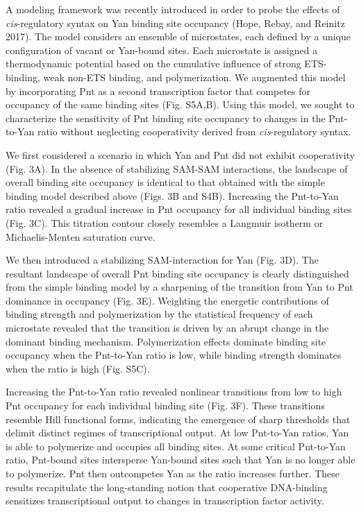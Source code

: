 A modeling framework was recently introduced in order to probe the effects of \textit{cis}-regulatory syntax on Yan binding site occupancy (Hope, Rebay, and Reinitz 2017). The model considers an ensemble of microstates, each defined by a unique configuration of vacant or Yan-bound sites. Each microstate is assigned a thermodynamic potential based on the cumulative influence of strong ETS-binding, weak non-ETS binding, and polymerization. We augmented this model by incorporating Pnt as a second transcription factor that competes for occupancy of the same binding sites (Fig. S5A,B). Using this model, we sought to characterize the sensitivity of Pnt binding site occupancy to changes in the Pnt-to-Yan ratio without neglecting cooperativity derived from \textit{cis}-regulatory syntax.

We first considered a scenario in which Yan and Pnt did not exhibit cooperativity (Fig. 3A). In the absence of stabilizing SAM-SAM interactions, the landscape of overall binding site occupancy is identical to that obtained with the simple binding model described above (Figs. 3B and S4B). Increasing the Pnt-to-Yan ratio revealed a gradual increase in Pnt occupancy for all individual binding sites (Fig. 3C). This titration contour closely resembles a Langmuir isotherm or Michaelis-Menten saturation curve.

We then introduced a stabilizing SAM-interaction for Yan (Fig. 3D). The resultant landscape of overall Pnt binding site occupancy is clearly distinguished from the simple binding model by a sharpening of the transition from Yan to Pnt dominance in occupancy (Fig. 3E). Weighting the energetic contributions of binding strength and polymerization by the statistical frequency of each microstate revealed that the transition is driven by an abrupt change in the dominant binding mechanism. Polymerization effects dominate binding site occupancy when the Pnt-to-Yan ratio is low, while binding strength dominates when the ratio is high (Fig. S5C).

Increasing the Pnt-to-Yan ratio revealed nonlinear transitions from low to high Pnt occupancy for each individual binding site (Fig. 3F). These transitions resemble Hill functional forms, indicating the emergence of sharp thresholds that delimit distinct regimes of transcriptional output. At low Pnt-to-Yan ratios, Yan is able to polymerize and occupies all binding sites. At some critical Pnt-to-Yan ratio, Pnt-bound sites intersperse Yan-bound sites such that Yan is no longer able to polymerize. Pnt then outcompetes Yan as the ratio increases further. These results recapitulate the long-standing notion that cooperative DNA-binding sensitizes transcriptional output to changes in transcription factor activity.

